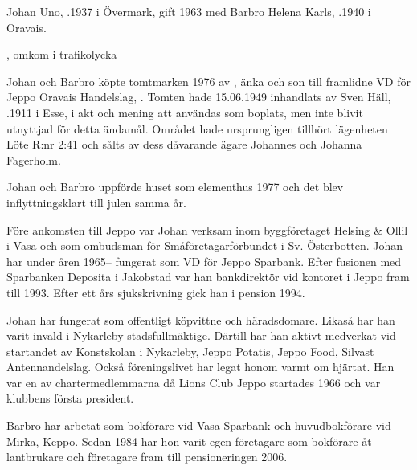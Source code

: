 %
Johan Uno, .1937 i Övermark, gift 1963 med Barbro Helena Karls, .1940 i Oravais.
\begin{jhchildren}
  \item {}
  \item {}, omkom i trafikolycka
  \item {}
\end{jhchildren}

Johan och Barbro köpte tomtmarken 1976 av , änka och son till framlidne VD för Jeppo Oravais Handelslag, . Tomten hade 15.06.1949 inhandlats av Sven Häll, .1911 i Esse, i akt och mening att användas som boplats, men inte blivit utnyttjad för detta ändamål. Området hade ursprungligen tillhört lägenheten Löte R:nr 2:41 och sålts av dess dåvarande ägare Johannes och Johanna Fagerholm.

Johan och Barbro uppförde huset som elementhus 1977 och det blev inflyttningsklart till julen samma år.

Före ankomsten till Jeppo var Johan verksam inom byggföretaget Helsing \& Ollil i Vasa och som ombudsman för Småföretagarförbundet i Sv. Österbotten. Johan har under åren 1965-- fungerat som VD för Jeppo Sparbank. Efter fusionen med Sparbanken Deposita i Jakobstad var han bankdirektör vid kontoret i Jeppo fram till 1993. Efter ett års sjukskrivning gick han i pension 1994.

Johan har fungerat som offentligt köpvittne och häradsdomare.	Likaså har han varit invald i Nykarleby stadsfullmäktige. Därtill har	han aktivt medverkat vid startandet av Konstskolan i Nykarleby,	Jeppo Potatis, Jeppo Food, Silvast Antennandelslag. Också föreningslivet har legat honom varmt om hjärtat. Han var en av chartermedlemmarna då Lions Club Jeppo startades 1966 och var klubbens första president.

Barbro har arbetat som bokförare vid Vasa Sparbank och huvudbokförare vid Mirka, Keppo. Sedan 1984 har hon varit egen företagare som bokförare åt lantbrukare och företagare fram till pensioneringen 2006.



